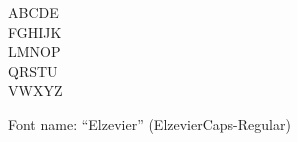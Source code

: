 \documentclass[a4paper]{article}
\begin{document}
\begin{center}
\fontsize{60pt}{72pt}
  ABCDE \\
  FGHIJK \\
  LMNOP \\
  QRSTU \\
  VWXYZ \\
\end{center}
\vfill
\begin{center}
Font name: ``Elzevier'' (ElzevierCaps-Regular)
\end{center}
\end{document}
